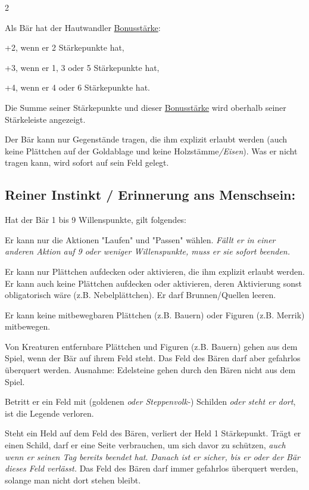 \documentclass[10pt, a4paper, oneside]{book}
\newcommand{\fan}[1]{\textit{#1}}
\begin{document}
\begin{multicols*}{2}
\begin{nobgcolor}
Als Bär hat der Hautwandler \hyperref[bonusstaerke]{Bonusstärke}:

\bullet{} +2, wenn er 2 Stärkepunkte hat,

\bullet{} +3, wenn er 1, 3 oder 5 Stärkepunkte hat,

\bullet{} +4, wenn er 4 oder 6 Stärkepunkte hat.

Die Summe seiner Stärkepunkte und dieser \hyperref[bonusstaerke]{Bonusstärke} wird oberhalb seiner Stärkeleiste angezeigt.


Der Bär kann nur Gegenstände tragen, die ihm explizit erlaubt werden (auch keine Plättchen auf der Goldablage\supercite{dh-faq} und keine Holzstämme\supercite{46402}\fan{/Eisen}). Was er nicht tragen kann, wird sofort auf sein Feld gelegt.





\subsection{Reiner Instinkt / Erinnerung ans Menschsein:}

Hat der Bär 1 bis 9 Willenspunkte, gilt folgendes:

Er kann nur die Aktionen "Laufen" und "Passen" wählen.
\supercite{46612,dh-baer}
\fan{Fällt er in einer anderen Aktion auf 9 oder weniger Willenspunkte, muss er sie sofort beenden.}

\bullet{} Er kann nur Plättchen aufdecken oder aktivieren, die ihm explizit erlaubt werden. Er kann auch keine Plättchen aufdecken oder aktivieren, deren Aktivierung sonst obligatorisch wäre (z.B. Nebelplättchen). Er darf Brunnen/Quellen leeren.
\supercite{dh-baer}

\bullet{} Er kann keine mitbewegbaren Plättchen (z.B. Bauern) oder Figuren (z.B. Merrik) mitbewegen\supercite{ag-begleitheft,dz-begleitheft}.

\bullet{} Von Kreaturen entfernbare Plättchen und Figuren (z.B. Bauern) gehen aus dem Spiel, wenn der Bär auf ihrem Feld steht. Das Feld des Bären darf aber gefahrlos überquert werden.
\supercite{dh-baer,dh-begleitheft}
Ausnahme: Edelsteine gehen durch den Bären nicht aus dem Spiel.

\bullet{} Betritt er ein Feld mit (goldenen \fan{oder Steppenvolk-}) Schilden \fan{oder steht er dort}, ist die Legende verloren. 
\supercite{dh-baer,dz-begleitheft}

\bullet{} Steht ein Held auf dem Feld des Bären, verliert der Held 1 Stärkepunkt. Trägt er einen Schild, darf er eine Seite verbrauchen, um sich davor zu schützen, \fan{auch wenn er seinen Tag bereits beendet hat}. \fan{Danach ist er sicher, bis er oder der Bär dieses Feld verlässt.}
Das Feld des Bären darf immer gefahrlos überquert werden, solange man nicht dort stehen bleibt.
\supercite{dh-baer,dh-begleitheft,46300} 



\end{nobgcolor}
\end{multicols*}
\end{document}
